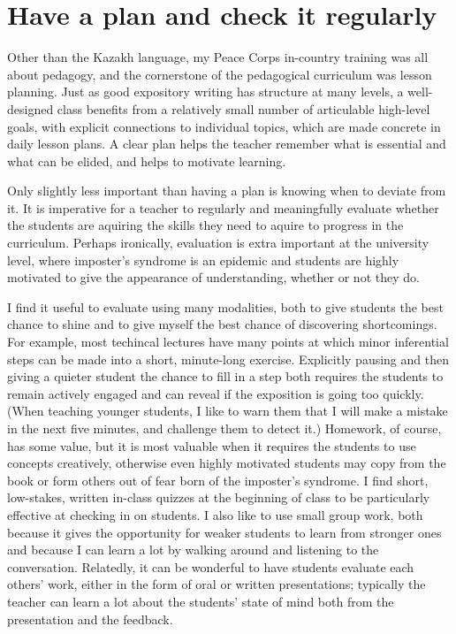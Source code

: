\section{Have a plan and check it regularly}

Other than the Kazakh language, my Peace Corps in-country training was all about
pedagogy, and the cornerstone of the pedagogical curriculum was lesson planning.
Just as good expository writing has structure at many levels, a well-designed
class benefits from a relatively small number of articulable high-level goals,
with explicit connections to individual topics, which are made concrete in daily
lesson plans.  A clear plan helps the teacher remember what is essential and
what can be elided, and helps to motivate learning.

Only slightly less important than having a plan is knowing when to deviate from
it.  It is imperative for a teacher to regularly and meaningfully evaluate
whether the students are aquiring the skills they need to aquire to progress in
the curriculum.  Perhaps ironically, evaluation is extra important at the
university level, where imposter's syndrome is an epidemic and students are
highly motivated to give the appearance of understanding, whether or not they
do.

I find it useful to evaluate using many modalities, both to give students the
best chance to shine and to give myself the best chance of discovering
shortcomings.  For example, most techincal lectures have many points at which
minor inferential steps can be made into a short, minute-long exercise.
Explicitly pausing and then giving a quieter student the chance to fill in a
step both requires the students to remain actively engaged and can reveal if the
exposition is going too quickly.  (When teaching younger students, I like to
warn them that I will make a mistake in the next five minutes, and challenge
them to detect it.)  Homework, of course, has some value, but it is most
valuable when it requires the students to use concepts creatively, otherwise
even highly motivated students may copy from the book or form others out of fear
born of the imposter's syndrome.  I find short, low-stakes, written in-class
quizzes at the beginning of class to be particularly effective at checking in on
students.  I also like to use small group work, both because it gives the
opportunity for weaker students to learn from stronger ones and because I can
learn a lot by walking around and listening to the conversation. Relatedly, it
can be wonderful to have students evaluate each others' work, either in the form
of oral or written presentations; typically the teacher can learn a lot about
the students' state of mind both from the presentation and the feedback.

